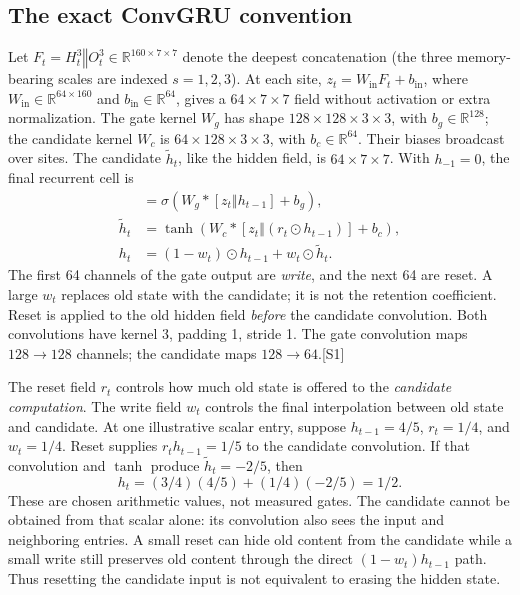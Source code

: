 \documentclass[10pt,letterpaper]{article}
\newcommand{\R}{\mathbb{R}}
\newcommand{\cat}{\mathbin\Vert}
\newcommand{\src}[1]{\textcolor{accent}{\textsf{[#1]}}}
\begin{document}
\subsection{The exact ConvGRU convention}
Let $F_t=H_t^3\cat O_t^3\in\R^{160\times7\times7}$ denote the deepest concatenation (the three memory-bearing scales are indexed $s=1,2,3$). At each site, $z_t=W_{\mathrm{in}}F_t+b_{\mathrm{in}}$, where $W_{\mathrm{in}}\in\R^{64\times160}$ and $b_{\mathrm{in}}\in\R^{64}$, gives a $64\times7\times7$ field without activation or extra normalization. The gate kernel $W_g$ has shape $128\times128\times3\times3$, with $b_g\in\R^{128}$; the candidate kernel $W_c$ is $64\times128\times3\times3$, with $b_c\in\R^{64}$. Their biases broadcast over sites. The candidate $\tilde h_t$, like the hidden field, is $64\times7\times7$. With $h_{-1}=0$, the final recurrent cell is
\begin{align}
[w_t,r_t]&=\sigma\!\left(W_g* [z_t\cat h_{t-1}]+b_g\right),\label{eq:gates}\\
\tilde h_t&=\tanh\!\left(W_c*[z_t\cat(r_t\odot h_{t-1})]+b_c\right),\\
h_t&=(1-w_t)\odot h_{t-1}+w_t\odot\tilde h_t.\label{eq:convgru}
\end{align}
The first 64 channels of the gate output are \emph{write}, and the next 64 are reset. A large $w_t$ replaces old state with the candidate; it is not the retention coefficient. Reset is applied to the old hidden field \emph{before} the candidate convolution. Both convolutions have kernel 3, padding 1, stride 1. The gate convolution maps $128\to128$ channels; the candidate maps $128\to64$.\src{S1}

The reset field $r_t$ controls how much old state is offered to the \emph{candidate computation}. The write field $w_t$ controls the final interpolation between old state and candidate. At one illustrative scalar entry, suppose $h_{t-1}=4/5$, $r_t=1/4$, and $w_t=1/4$. Reset supplies $r_th_{t-1}=1/5$ to the candidate convolution. If that convolution and $\tanh$ produce $\tilde h_t=-2/5$, then
\begin{equation}
h_t=(3/4)(4/5)+(1/4)(-2/5)=1/2.
\end{equation}
These are chosen arithmetic values, not measured gates. The candidate cannot be obtained from that scalar alone: its convolution also sees the input and neighboring entries. A small reset can hide old content from the candidate while a small write still preserves old content through the direct $(1-w_t)h_{t-1}$ path. Thus resetting the candidate input is not equivalent to erasing the hidden state.
\end{document}
